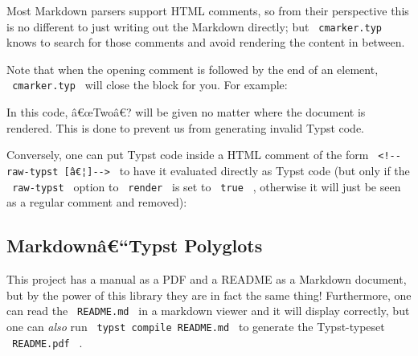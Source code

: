 \begin{Shaded}
\begin{Highlighting}[]
\end{Highlighting}
\end{Shaded}

Most Markdown parsers support HTML comments, so from their perspective
this is no different to just writing out the Markdown directly; but
\texttt{\ cmarker.typ\ } knows to search for those comments and avoid
rendering the content in between.

Note that when the opening comment is followed by the end of an element,
\texttt{\ cmarker.typ\ } will close the block for you. For example:

\begin{Shaded}
\begin{Highlighting}[]
\AttributeTok{\textgreater{} }

\end{Highlighting}
\end{Shaded}

In this code, â€œTwoâ€? will be given no matter where the document is
rendered. This is done to prevent us from generating invalid Typst code.

Conversely, one can put Typst code inside a HTML comment of the form
\texttt{\ \textless{}!-\/-raw-typst\ {[}â€¦{]}-\/-\textgreater{}\ } to
have it evaluated directly as Typst code (but only if the
\texttt{\ raw-typst\ } option to \texttt{\ render\ } is set to
\texttt{\ true\ } , otherwise it will just be seen as a regular comment
and removed):

\begin{Shaded}
\begin{Highlighting}[]

\end{Highlighting}
\end{Shaded}

\subsection{Markdownâ€``Typst
Polyglots}\label{markdownuxe2typst-polyglots}

This project has a manual as a PDF and a README as a Markdown document,
but by the power of this library they are in fact the same thing!
Furthermore, one can read the \texttt{\ README.md\ } in a markdown
viewer and it will display correctly, but one can \emph{also} run
\texttt{\ typst\ compile\ README.md\ } to generate the Typst-typeset
\texttt{\ README.pdf\ } .

